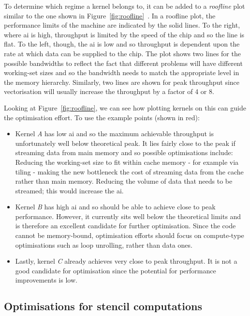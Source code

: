 To determine which regime a kernel belongs to, it can be added to a \textit{roofline} plot similar to the one shown in Figure~\ref{fig:roofline}~\cite{williamsRooflineInsightfulVisual2009}.
In a roofline plot, the performance limits of the machine are indicated by the solid lines.
To the right, where \gls{ai} is high, throughput is limited by the speed of the chip and so the line is flat.
To the left, though, the \gls{ai} is low and so throughput is dependent upon the rate at which data can be supplied to the chip.
The plot shows two lines for the possible bandwidths to reflect the fact that different problems will have different working-set sizes and so the bandwidth needs to match the appropriate level in the memory hierarchy.
Similarly, two lines are shown for peak throughput since vectorisation will usually increase the throughput by a factor of 4 or 8.

Looking at Figure~\ref{fig:roofline}, we can see how plotting kernels on this can guide the optimisation effort.
To use the example points (shown in red):

\begin{itemize}
  \item
    Kernel \textit{A} has low \gls{ai} and so the maximum achievable throughput is unfortunately well below theoretical peak.
    It lies fairly close to the peak if streaming data from main memory and so possible optimisations include:
    Reducing the working-set size to fit within cache memory - for example via tiling - making the new bottleneck the cost of streaming data from the cache rather than main memory.
    Reducing the volume of data that needs to be streamed; this would increase the \gls{ai}.

  \item
    Kernel \textit{B} has high \gls{ai} and so should be able to achieve close to peak performance.
    However, it currently sits well below the theoretical limits and is therefore an excellent candidate for further optimisation.
    Since the code cannot be memory-bound, optimisation efforts should focus on compute-type optimisations such as loop unrolling, rather than data ones.

  \item
    Lastly, kernel \textit{C} already achieves very close to peak throughput.
    It is not a good candidate for optimisation since the potential for performance improvements is low.
\end{itemize}

\subsection{Optimisations for stencil computations}

